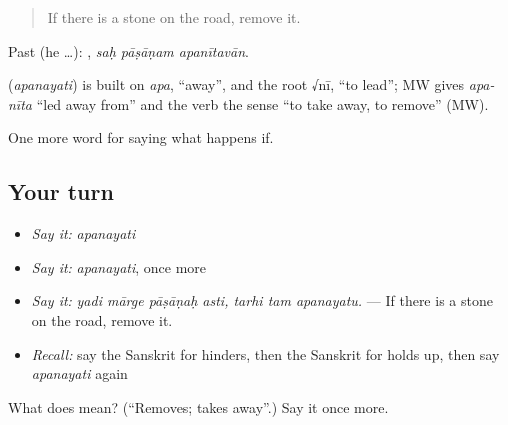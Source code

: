 \begin{quote}
If there is a stone on the road, remove it.
\end{quote}

Past (he …):   , \emph{saḥ pāṣāṇam apanītavān}.

\begin{cousinweb}
\textbf{} (\emph{apanayati}) is built on \emph{apa}, \textquotedblleft{}away\textquotedblright{}, and the root √nī, \textquotedblleft{}to lead\textquotedblright{}; MW gives \emph{apa-nīta} \textquotedblleft{}led away from\textquotedblright{} and the verb the sense \textquotedblleft{}to take away, to remove\textquotedblright{} (MW).
\end{cousinweb}

\begin{grammarlens}[title={What you've built}]
One more word for saying what happens if.
\end{grammarlens}

\subsection*{Your turn}
\begin{itemize}
\raggedright
  \item \emph{Say it:} \emph{apanayati}
  \item \emph{Say it:} \emph{apanayati}, once more
  \item \emph{Say it:} \emph{yadi mārge pāṣāṇaḥ asti, tarhi tam apanayatu.} — If there is a stone on the road, remove it.
  \item \emph{Recall:} say the Sanskrit for hinders, then the Sanskrit for holds up, then say \emph{apanayati} again
\end{itemize}

\begin{tcolorbox}[breakable,colback=teal!4,colframe=teal!35!black,title={Before you move on}]
What does  mean? (\textquotedblleft{}Removes; takes away\textquotedblright{}.) Say it once more.
\end{tcolorbox}
